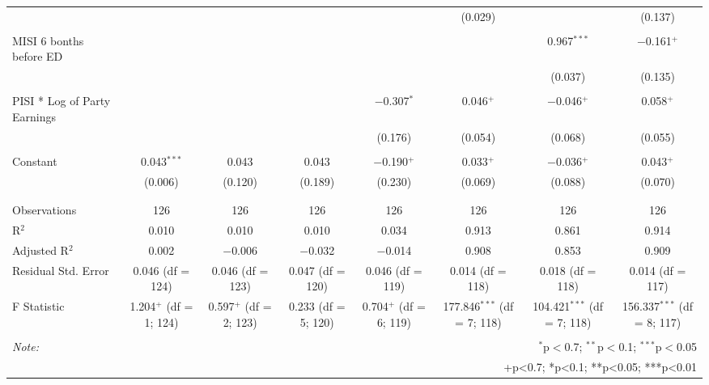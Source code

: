 \begin{table}[!htbp]
\begin{tabular}{@{\extracolsep{50pt}}lccccccc}
  &  &  &  &  & (0.029) &  & (0.137) \\ 
  & & & & & & & \\ 
 MISI 6 bonths before ED &  &  &  &  &  & 0.967$^{***}$ & $-$0.161$^{+}$ \\ 
  &  &  &  &  &  & (0.037) & (0.135) \\ 
  & & & & & & & \\ 
 PISI * Log of Party Earnings &  &  &  & $-$0.307$^{*}$ & 0.046$^{+}$ & $-$0.046$^{+}$ & 0.058$^{+}$ \\ 
  &  &  &  & (0.176) & (0.054) & (0.068) & (0.055) \\ 
  & & & & & & & \\ 
 Constant & 0.043$^{***}$ & 0.043 & 0.043 & $-$0.190$^{+}$ & 0.033$^{+}$ & $-$0.036$^{+}$ & 0.043$^{+}$ \\ 
  & (0.006) & (0.120) & (0.189) & (0.230) & (0.069) & (0.088) & (0.070) \\ 
  & & & & & & & \\ 
\hline \\[-1.8ex] 
Observations & 126 & 126 & 126 & 126 & 126 & 126 & 126 \\ 
R$^{2}$ & 0.010 & 0.010 & 0.010 & 0.034 & 0.913 & 0.861 & 0.914 \\ 
Adjusted R$^{2}$ & 0.002 & $-$0.006 & $-$0.032 & $-$0.014 & 0.908 & 0.853 & 0.909 \\ 
Residual Std. Error & 0.046 (df = 124) & 0.046 (df = 123) & 0.047 (df = 120) & 0.046 (df = 119) & 0.014 (df = 118) & 0.018 (df = 118) & 0.014 (df = 117) \\ 
F Statistic & 1.204$^{+}$ (df = 1; 124) & 0.597$^{+}$ (df = 2; 123) & 0.233 (df = 5; 120) & 0.704$^{+}$ (df = 6; 119) & 177.846$^{***}$ (df = 7; 118) & 104.421$^{***}$ (df = 7; 118) & 156.337$^{***}$ (df = 8; 117) \\ 
\hline 
\hline \\[-1.8ex] 
\textit{Note:}  & \multicolumn{7}{r}{$^{*}$p$<$0.7; $^{**}$p$<$0.1; $^{***}$p$<$0.05} \\ 
 & \multicolumn{7}{r}{+p<0.7; *p<0.1; **p<0.05; ***p<0.01} \\ 
\end{tabular} 
\end{table} 
